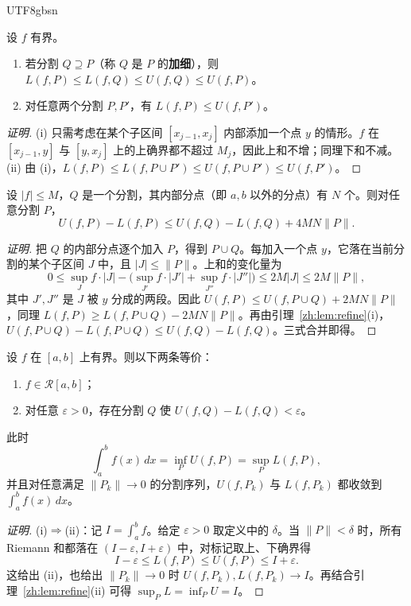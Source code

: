 \documentclass[11pt]{article}
\makeatletter
\newcommand{\envlabel}[1]{\protected@edef\@currentlabel{\themathenv}\label{#1}}
\makeatother
\begin{document}
\begin{CJK*}{UTF8}{gbsn}
\begin{lemma}\envlabel{zh:lem:refine}
设 $f$ 有界。
\begin{enumerate}
  \item 若分割 $Q\supseteq P$（称 $Q$ 是 $P$ 的\textbf{加细}），则 $L(f,P)\leq L(f,Q)\leq U(f,Q)\leq U(f,P)$。
  \item 对任意两个分割 $P,P'$，有 $L(f,P)\leq U(f,P')$。
\end{enumerate}
\end{lemma}

\begin{proof}[证明]
(i) 只需考虑在某个子区间 $[x_{j-1},x_{j}]$ 内部添加一个点 $y$ 的情形。$f$ 在 $[x_{j-1},y]$ 与 $[y,x_{j}]$ 上的上确界都不超过 $M_{j}$，因此上和不增；同理下和不减。(ii) 由 (i)，$L(f,P)\leq L(f,P\cup P')\leq U(f,P\cup P')\leq U(f,P')$。
\end{proof}

\begin{lemma}\envlabel{zh:lem:mesh}
设 $|f|\leq M$，$Q$ 是一个分割，其内部分点（即 $a,b$ 以外的分点）有 $N$ 个。则对任意分割 $P$，
\[
U(f,P)-L(f,P)\leq U(f,Q)-L(f,Q)+4MN\|P\|.
\]
\end{lemma}

\begin{proof}[证明]
把 $Q$ 的内部分点逐个加入 $P$，得到 $P\cup Q$。每加入一个点 $y$，它落在当前分割的某个子区间 $J$ 中，且 $|J|\leq\|P\|$。上和的变化量为
\[
0\leq \sup_{J}f\cdot|J|-\big(\sup_{J'}f\cdot|J'|+\sup_{J''}f\cdot|J''|\big)\leq 2M|J|\leq 2M\|P\|,
\]
其中 $J',J''$ 是 $J$ 被 $y$ 分成的两段。因此 $U(f,P)\leq U(f,P\cup Q)+2MN\|P\|$，同理 $L(f,P)\geq L(f,P\cup Q)-2MN\|P\|$。再由引理~\ref{zh:lem:refine}(i)，$U(f,P\cup Q)-L(f,P\cup Q)\leq U(f,Q)-L(f,Q)$。三式合并即得。
\end{proof}

\begin{theorem}[Darboux 判据]\envlabel{zh:thm:darboux}
设 $f$ 在 $[a,b]$ 上有界。则以下两条等价：
\begin{enumerate}
  \item $f\in\mathcal{R}[a,b]$；
  \item 对任意 $\varepsilon>0$，存在分割 $Q$ 使 $U(f,Q)-L(f,Q)<\varepsilon$。
\end{enumerate}
此时
\[
\int_{a}^{b}f(x)\,dx=\inf_{P}U(f,P)=\sup_{P}L(f,P),
\]
并且对任意满足 $\|P_{k}\|\to0$ 的分割序列，$U(f,P_{k})$ 与 $L(f,P_{k})$ 都收敛到 $\int_{a}^{b}f(x)\,dx$。
\end{theorem}

\begin{proof}[证明]
(i)$\Rightarrow$(ii)：记 $I=\int_{a}^{b}f$。给定 $\varepsilon>0$ 取定义中的 $\delta$。当 $\|P\|<\delta$ 时，所有 Riemann 和都落在 $(I-\varepsilon,I+\varepsilon)$ 中，对标记取上、下确界得
\[
I-\varepsilon\leq L(f,P)\leq U(f,P)\leq I+\varepsilon.
\]
这给出 (ii)，也给出 $\|P_{k}\|\to0$ 时 $U(f,P_{k}),L(f,P_{k})\to I$。再结合引理~\ref{zh:lem:refine}(ii) 可得 $\sup_{P}L=\inf_{P}U=I$。


\end{proof}
\end{CJK*}
\end{document}
